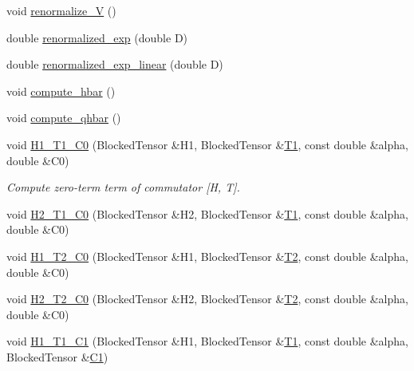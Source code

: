 \begin{DoxyCompactItemize}
void \mbox{\hyperlink{classforte_1_1_m_r_d_s_r_g___s_o_a94cb5931dd60e1c19c6440281718d4ca}{renormalize\+\_\+V}} ()
\item 
double \mbox{\hyperlink{classforte_1_1_m_r_d_s_r_g___s_o_a1523406f5b311fc93599b83d48ff9a6e}{renormalized\+\_\+exp}} (double D)
\item 
double \mbox{\hyperlink{classforte_1_1_m_r_d_s_r_g___s_o_a1bd9a1dbc7a04f8da9276c000237fff2}{renormalized\+\_\+exp\+\_\+linear}} (double D)
\item 
void \mbox{\hyperlink{classforte_1_1_m_r_d_s_r_g___s_o_abddd0970f2fdd9e1f69ffb6cfe23b57b}{compute\+\_\+hbar}} ()
\item 
void \mbox{\hyperlink{classforte_1_1_m_r_d_s_r_g___s_o_a30ec105990c8d66065051fdd8e4ddf36}{compute\+\_\+qhbar}} ()
\item 
void \mbox{\hyperlink{classforte_1_1_m_r_d_s_r_g___s_o_aa4920316bbe47fe37ca3f282490a4e5c}{H1\+\_\+\+T1\+\_\+\+C0}} (Blocked\+Tensor \&H1, Blocked\+Tensor \&\mbox{\hyperlink{classforte_1_1_m_r_d_s_r_g___s_o_afa42761edf9b73171b843cbb11b575c1}{T1}}, const double \&alpha, double \&C0)
\begin{DoxyCompactList}\small\item\em Compute zero-\/term term of commutator \mbox{[}H, T\mbox{]}. \end{DoxyCompactList}\item 
void \mbox{\hyperlink{classforte_1_1_m_r_d_s_r_g___s_o_a267e2c529dbbe8001b324a0fba789be1}{H2\+\_\+\+T1\+\_\+\+C0}} (Blocked\+Tensor \&H2, Blocked\+Tensor \&\mbox{\hyperlink{classforte_1_1_m_r_d_s_r_g___s_o_afa42761edf9b73171b843cbb11b575c1}{T1}}, const double \&alpha, double \&C0)
\item 
void \mbox{\hyperlink{classforte_1_1_m_r_d_s_r_g___s_o_aedd91e1777888b57e701459abef10eba}{H1\+\_\+\+T2\+\_\+\+C0}} (Blocked\+Tensor \&H1, Blocked\+Tensor \&\mbox{\hyperlink{classforte_1_1_m_r_d_s_r_g___s_o_a43f64aec5c3777de5bc476ae946e0928}{T2}}, const double \&alpha, double \&C0)
\item 
void \mbox{\hyperlink{classforte_1_1_m_r_d_s_r_g___s_o_a8dfad52e60ccf3aee5bbe197236a35c5}{H2\+\_\+\+T2\+\_\+\+C0}} (Blocked\+Tensor \&H2, Blocked\+Tensor \&\mbox{\hyperlink{classforte_1_1_m_r_d_s_r_g___s_o_a43f64aec5c3777de5bc476ae946e0928}{T2}}, const double \&alpha, double \&C0)
\item 
void \mbox{\hyperlink{classforte_1_1_m_r_d_s_r_g___s_o_a2a362b81e0b31d030eecbe5f20a4e353}{H1\+\_\+\+T1\+\_\+\+C1}} (Blocked\+Tensor \&H1, Blocked\+Tensor \&\mbox{\hyperlink{classforte_1_1_m_r_d_s_r_g___s_o_afa42761edf9b73171b843cbb11b575c1}{T1}}, const double \&alpha, Blocked\+Tensor \&\mbox{\hyperlink{namespaceforte_abe00ec86d0015c0f2b6ac298c6e428e4a1a2ddc2db4693cfd16d534cde5572cc1}{C1}})

\end{DoxyCompactItemize}
